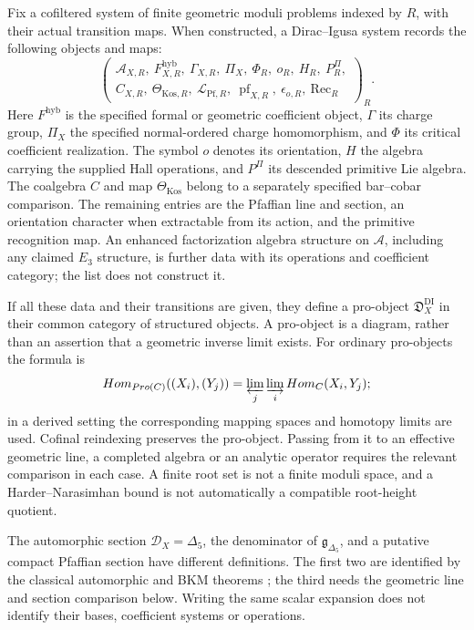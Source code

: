 Fix a cofiltered system of finite geometric moduli problems indexed
by \(R\), with their actual transition maps.  When constructed, a
Dirac--Igusa system records the following objects and maps:
\[
 \left(
 \begin{gathered}
 \mathcal A_{X,R},\ F^{\mathrm{hyb}}_{X,R},\
 \Gamma_{X,R},\ \Pi_X,\ \Phi_R,\ o_R,\ H_R,\ P_R^\Pi,\\
 C_{X,R},\ \Theta_{\mathrm{Kos},R},\
 \mathscr L_{\mathrm{Pf},R},\ \operatorname{pf}_{X,R},\
 \epsilon_{o,R},\ \mathrm{Rec}_R
 \end{gathered}
 \right)_R.
\]
Here \(F^{\mathrm{hyb}}\) is the specified formal or geometric
coefficient object, \(\Gamma\) its charge group, \(\Pi_X\) the
specified normal-ordered charge homomorphism, and \(\Phi\) its critical
coefficient realization.  The symbol
\(o\) denotes its orientation, \(H\) the algebra carrying the supplied Hall
operations, and \(P^\Pi\) its descended primitive Lie algebra.
The coalgebra \(C\) and map \(\Theta_{\mathrm{Kos}}\) belong to a
separately specified bar--cobar comparison.  The remaining entries
are the Pfaffian line and section, an orientation character when
extractable from its action, and the primitive recognition map.
An enhanced factorization algebra structure on \(\mathcal A\),
including any claimed \(E_3\) structure, is further data with its
operations and coefficient category; the list does not construct it.

If all these data and their transitions are given, they define a
pro-object \(\mathfrak D_X^{\mathrm{DI}}\) in their common category
of structured objects.  A pro-object is a diagram, rather than an
assertion that a geometric inverse limit exists.  For ordinary
pro-objects the formula is
\[
 \operatorname{Hom}_{\operatorname{Pro}(\mathcal C)}
 ((X_i),(Y_j))
 =\varprojlim_j\varinjlim_i\operatorname{Hom}_{\mathcal C}(X_i,Y_j);
\]
in a derived setting the corresponding mapping spaces and homotopy
limits are used.  Cofinal reindexing preserves the pro-object.
Passing from it to an effective geometric line, a completed algebra
or an analytic operator requires the relevant comparison in each
case.  A finite root set is not a finite moduli space, and a
Harder--Narasimhan bound is not automatically a compatible root-height
quotient.

\begin{remark}[Three objects attached to \(\Delta_5\)]
\label{rem:ch6-three-delta-names}
The automorphic section \(\mathcal D_X=\Delta_5\), the denominator
of \(\mathfrak g_{\Delta_5}\), and a putative compact Pfaffian
section have different definitions.  The first two are identified
by the classical automorphic and BKM theorems
\cite{Borcherds95,GN,GNPartI,GNII}; the third needs the geometric
line and section comparison below.  Writing the same scalar
expansion does not identify their bases, coefficient systems or
operations.
\end{remark}

